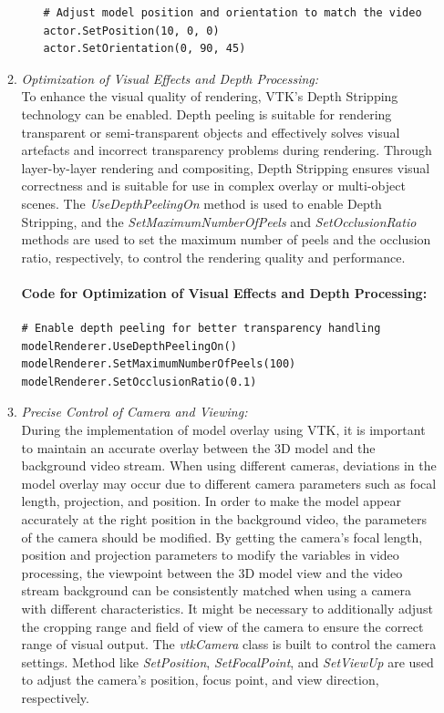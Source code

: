 \documentclass[12pt]{article}
\begin{document}
\begin{enumerate}
\begin{enumerate}
\begin{itemize}
\begin{verbatim}
# Adjust model position and orientation to match the video
actor.SetPosition(10, 0, 0)
actor.SetOrientation(0, 90, 45)
                              \end{verbatim}
                        \end{itemize}
                        \item \textit{Optimization of Visual Effects and Depth Processing:}
                        \\
                        To enhance the visual quality of rendering, VTK's Depth Stripping technology can be enabled. Depth peeling is suitable for rendering transparent or semi-transparent objects and effectively solves visual artefacts and incorrect transparency problems during rendering. Through layer-by-layer rendering and compositing, Depth Stripping ensures visual correctness and is suitable for use in complex overlay or multi-object scenes.\cite{vtk_dualdepth_2016,5357714} The \emph{UseDepthPeelingOn} method is used to enable Depth Stripping, and the \emph{SetMaximumNumberOfPeels} and \emph{SetOcclusionRatio} methods are used to set the maximum number of peels and the occlusion ratio, respectively, to control the rendering quality and performance.
                        \paragraph{Code for Optimization of Visual Effects and Depth Processing:}
                        \begin{verbatim}
# Enable depth peeling for better transparency handling
modelRenderer.UseDepthPeelingOn()
modelRenderer.SetMaximumNumberOfPeels(100)
modelRenderer.SetOcclusionRatio(0.1)
                        \end{verbatim}
                        \item \textit{Precise Control of Camera and Viewing:}
                        \\
                        During the implementation of model overlay using VTK, it is important to maintain an accurate overlay between the 3D model and the background video stream. When using different cameras, deviations in the model overlay may occur due to different camera parameters such as focal length, projection, and position. In order to make the model appear accurately at the right position in the background video, the parameters of the camera should be modified. By getting the camera's focal length, position and projection parameters to modify the variables in video processing, the viewpoint between the 3D model view and the video stream background can be consistently matched when using a camera with different characteristics. It might be necessary to additionally adjust the cropping range and field of view of the camera to ensure the correct range of visual output. The \emph{vtkCamera} class is built to control the camera settings. Method like \emph{SetPosition}, \emph{SetFocalPoint}, and \emph{SetViewUp} are used to adjust the camera's position, focus point, and view direction, respectively.\cite{vtk_examples_camera,vtk_camera_doc_2023}

\end{enumerate}
\end{enumerate}
\end{document}
